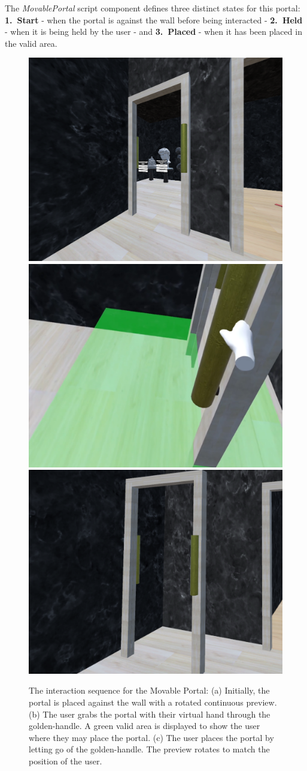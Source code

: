 The \textit{MovablePortal} script component defines three distinct states for this portal: \textbf{1.~Start} - when the portal is 
against the wall before being interacted - \textbf{2.~Held} - when it is being held by the user - and \textbf{3.~Placed} - when it has been 
placed in the valid area.
\begin{figure}[t]
    \centering
    \mbox{} \hfill
    \includegraphics[width=.45\linewidth]{NOVAthesisFiles/Images/screenshots/mov-portal-a.png}
    \hfill
    \includegraphics[width=.45\linewidth]{NOVAthesisFiles/Images/screenshots/mov-portal-b.png}
    \hfill \mbox{}
    \includegraphics[width=.45\linewidth]{NOVAthesisFiles/Images/screenshots/mov-portal-c.png}
    \caption{The interaction sequence for the Movable Portal: (a) Initially, the portal is placed against the wall with a rotated continuous preview. (b) The user grabs the portal with their virtual hand through the golden-handle. A green valid area is displayed to show the user where they may place the portal. (c) The user places the portal by letting go of the golden-handle. The preview rotates to match the position of the user.}
  \label{fig:mov-portal-sc}
\end{figure}

